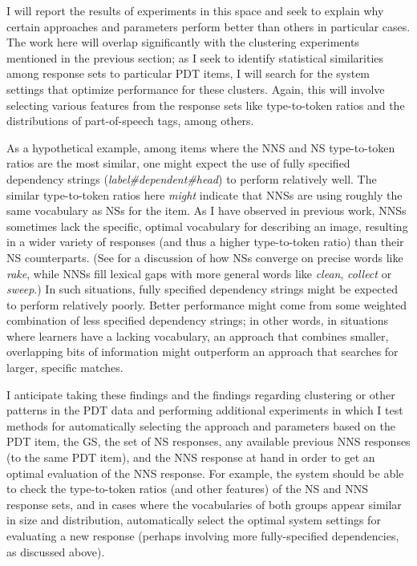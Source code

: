 \documentclass[11pt]{article}
\begin{document}
I will report the results of experiments in this space and seek to explain why certain approaches and parameters perform better than others in particular cases.
The work here will overlap significantly with the clustering experiments mentioned in the previous section; as I seek to identify statistical similarities among response sets to particular PDT items, I will search for the system settings that optimize performance for these clusters. Again, this will involve selecting various features from the response sets like type-to-token ratios and the distributions of part-of-speech tags, among others.
\par
As a hypothetical example, among items where the NNS and NS type-to-token ratios are the most similar, one might expect the use of fully specified dependency strings (\textit{label\#dependent\#head}) to perform relatively well. The similar type-to-token ratios here \textit{might} indicate that NNSs are using roughly the same vocabulary as NSs for the item. As I have observed in previous work, NNSs sometimes lack the specific, optimal vocabulary for describing an image, resulting in a wider variety of responses (and thus a higher type-to-token ratio) than their NS counterparts. (See \citet{king:dickinson:13} for a discussion of how NSs converge on precise words like \textit{rake}, while NNSs fill lexical gaps with more general words like \textit{clean}, \textit{collect} or \textit{sweep}.) In such situations, fully specified dependency strings might be expected to perform relatively poorly. Better performance might come from some weighted combination of less specified dependency strings; in other words, in situations where learners have a lacking vocabulary, an approach that combines smaller, overlapping bits of information might outperform an approach that searches for larger, specific matches. 
\par
I anticipate taking these findings and the findings regarding clustering or other patterns in the PDT data and performing additional experiments in which I test methods for automatically selecting the approach and parameters based on the PDT item, the GS, the set of NS responses, any available previous NNS responses (to the same PDT item), and the NNS response at hand in order to get an optimal evaluation of the NNS response. For example, the system should be able to check the type-to-token ratios (and other features) of the NS and NNS response sets, and in cases where the vocabularies of both groups appear similar in size and distribution, automatically select the optimal system settings for evaluating a new response (perhaps involving more fully-specified dependencies, as discussed above).
\end{document}
